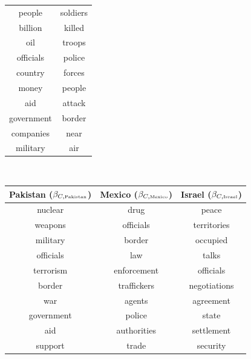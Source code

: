 \begin{figure}
\begin{tabular}{|cc|}
  people & soldiers \\
  billion & killed \\
  oil & troops \\
  officials & police \\
  country & forces \\
  money & people \\
  aid & attack \\
  government & border \\
  companies & near \\
  military & air \\
  \hline
\end{tabular}
\\
\vspace{30pt}
\begin{tabular}{|c|c|c|}
  \hline
  \textbf{Pakistan ($\beta_{C,\mbox{\tiny Pakistan}}$)} &
  \textbf{Mexico ($\beta_{C,\mbox{\tiny Mexico}}$)} &
  \textbf{Israel ($\beta_{C,\mbox{\tiny Israel}}$)} \\
  \hline
  nuclear & drug & peace \\
  weapons & officials & territories \\
  military & border & occupied \\
  officials & law & talks \\
  terrorism & enforcement & officials \\
  border & traffickers & negotiations \\
  war & agents & agreement \\
  government & police & state\\
  aid & authorities & settlement \\
  support & trade & security \\
  \hline
\end{tabular}
\vspace{10pt}
\begin{tabular}{|c|c|c|}
  \hline

\end{tabular}
\end{figure}
